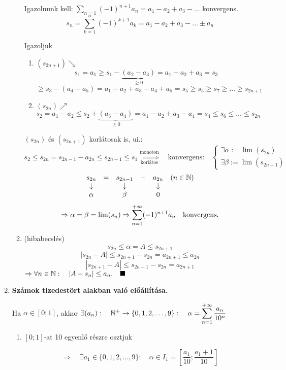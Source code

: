 \documentclass[a4paper,11.5pt]{article}
\begin{document}
\begin{enumerate}
\begin{enumerate}
			Igazolnunk kell: $\displaystyle\sum_{n=1}(-1)^{n+1}a_n=a_1-a_2+a_3-\ldots$ konvergens.
			\[ s_n=\sum_{k=1}^n(-1)^{k+1}a_k=a_1-a_2+a_3-\ldots\pm a_n \]
			
			Igazoljuk 
			\begin{enumerate}
				\item $(s_{2n+1})\searrow$
				\[ s_1=a_1\geq s_1-\underbrace{(a_2-a_3)}_{\geq 0}=a_1-a_2+a_3=s_3 \]
				\[ \geq s_3-(a_4-a_5)=a_1-a_2+a_3-a_4+a_5=s_5\geq s_5\geq s_7 \geq\ldots\geq s_{2n+1} \]
				\item $(s_{2n})\nearrow$
				\[ s_2=a_1-a_2\leq s_2+\underbrace{(a_3-a_4)}_{\geq 0}=a_1-a_2+a_3-a_4=s_4\leq s_6\leq\ldots\leq s_{2n} \]
			\end{enumerate}
			$(s_{2n})$ és $(s_{2n+1})$ korlátosak is, ui.: \[s_2\leq s_{2n}=s_{2n-1}-a_{2n}\leq s_{2n-1} \leq s_1 \overset{\text{monoton}}{\underset{\text{korlátos}}{\Longrightarrow}} \quad\text{konvergens:}\quad
			\left\{\begin{gathered}
				\exists \alpha:=\lim(s_{2n})\\				
				\exists \beta:=\lim(s_{2n+1})
			\end{gathered}\right. \]
			\[ \begin{matrix}
				s_{2n}&=&s_{2n-1}&-&a_{2n}& (n\in \mathbb{N})\\
				\downarrow&&\downarrow&&\downarrow&\\
				\alpha&&\beta&&0&
			\end{matrix} \]
			\[\Rightarrow \alpha=\beta=\lim(s_n) \Rightarrow\displaystyle\sum_{n=1}^{+\infty}(-1)^{n+1}a_n \quad\text{konvergens.} \]
		\item (hibabecslés)
		\[ s_{2n}\leq\alpha= A\leq s_{2n+1} \]
		\[ |s_{2n}-A|\leq s_{2n+1}-s_{2n}=a_{2n+1}\leq a_{2n} \]
		\[ |s_{2n+1}-A|\leq s_{2n+1}-s_{2n}=a_{2n+1} \]
		$\Rightarrow \forall n\in \mathbb{N}: \quad |A-s_n|\leq a_n. \quad \blacksquare$
		\end{enumerate}
		
		\item \textbf{Számok tizedestört alakban való előállítása.}
		
		Ha $\alpha\in[0;1]$, akkor $\displaystyle\exists (a_n):\quad \mathbb{N}^+\to\{0,1,2,\ldots,9\}: \quad \alpha=\displaystyle\sum_{n=1}^{+\infty} \frac{a_n}{10^n}$
		
		\biz
		\begin{enumerate}[1. lépés:]
			\item $[0;1]$-at 10 egyenlő részre osztjuk
			
			\[\Rightarrow\quad \exists a_1\in\{0,1,2,\ldots,9\}:\quad \alpha \in I_1=\left[\frac{a_1}{10};\frac{a_1+1}{10}\right]\]
			

\end{enumerate}
\end{enumerate}
\end{document}
